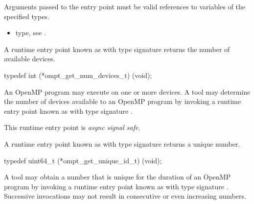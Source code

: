 \constraints

Arguments passed to the entry point must be valid
references to variables of the specified types.

\crossreferences
\begin{itemize}
\item {} type, see .
\end{itemize}

\label{sec:ompt_get_num_devices_t}
\label{sec:ompt_get_num_devices}

\summary
A runtime entry point known as 
with type signature 
returns the number of available devices.

\format
\begin{ccppspecific}
\begin{omptInquiry}
typedef int (*ompt_get_num_devices_t) (void);
\end{omptInquiry}
\end{ccppspecific}

\descr

An OpenMP program may execute on one or more devices.
A tool may determine the number of devices available to an OpenMP
program by invoking a runtime entry point
known as 
with type signature .

This runtime entry point is \emph{async signal safe}.



\label{sec:ompt_get_unique_id_t}
\label{sec:ompt_get_unique_id}

\summary
A runtime entry point known as 
with type signature 
returns a unique number.

\format
\begin{ccppspecific}
\begin{omptInquiry}
typedef uint64_t (*ompt_get_unique_id_t) (void);
\end{omptInquiry}
\end{ccppspecific}

\descr

A tool may obtain a number that is unique for the duration of an
OpenMP program by invoking a runtime entry point
known as 
with type signature .
Successive invocations may not result in
consecutive or even increasing numbers.

